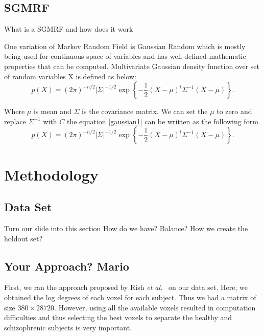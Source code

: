 \documentclass{article} %
\begin{document}
\subsection{SGMRF}
What is a SGMRF and how does it work

One variation of Markov Random Field is Gaussian Random which is mostly being used for continuous space of variables and has well-defined mathematic properties that can be computed. Multivariate Gaussian density function over set of random variables X is defined as below: 
\begin{equation}\label{gaussian1}
p(X) = (2\pi)^{-n/2} |\Sigma|^{-1/2} \exp\left\{ -\frac{1}{2}(X - \mu)^t \Sigma^{-1} (X - \mu) \right\}.
\end{equation}
 
Where $ \mu $   is mean and $ \Sigma $ is the covariance matrix. We can set the $ \mu$ to zero and replace $\Sigma^{-1}$ with $C$ the equation \eqref{gaussian1} can be written as the following form.
\begin{equation}\label{gaussian2}
p(X) = (2\pi)^{-n/2} |\Sigma|^{-1/2} \exp\left\{ -\frac{1}{2}(X - \mu)^t \Sigma^{-1} (X - \mu) \right\}.
\end{equation}
\section{Methodology}

\subsection{Data Set}
Turn our slide into this section
How do we have? Balance? 
How we create the holdout set?


\subsection{Your Approach? Mario}
First, we ran the approach proposed by Rish \emph{et al.}~\cite{Rish_2013} on our data set. Here, we obtained the log degrees of each voxel for each subject. Thus we had a matrix of size  $380 \times 28720$. However, using all the available voxels resulted in computation difficulties and thus selecting the best voxels to separate the healthy and schizophrenic subjects is very important. 
\end{document}
